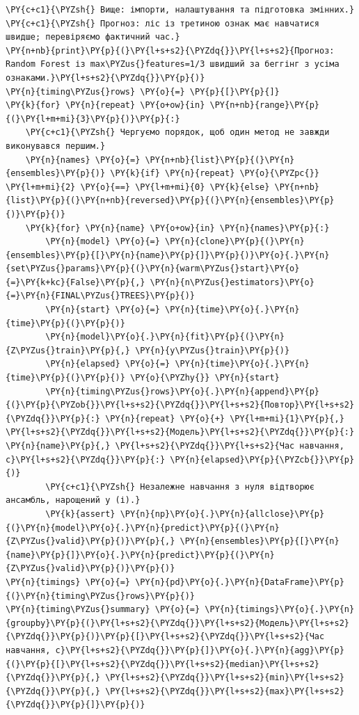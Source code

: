 \begin{Verbatim}[commandchars=\\\{\}]
\PY{c+c1}{\PYZsh{} Вище: імпорти, налаштування та підготовка змінних.}
\PY{c+c1}{\PYZsh{} Прогноз: ліс із третиною ознак має навчатися швидше; перевіряємо фактичний час.}
\PY{n+nb}{print}\PY{p}{(}\PY{l+s+s2}{\PYZdq{}}\PY{l+s+s2}{Прогноз: Random Forest із max\PYZus{}features=1/3 швидший за беггінг з усіма ознаками.}\PY{l+s+s2}{\PYZdq{}}\PY{p}{)}
\PY{n}{timing\PYZus{}rows} \PY{o}{=} \PY{p}{[}\PY{p}{]}
\PY{k}{for} \PY{n}{repeat} \PY{o+ow}{in} \PY{n+nb}{range}\PY{p}{(}\PY{l+m+mi}{3}\PY{p}{)}\PY{p}{:}
    \PY{c+c1}{\PYZsh{} Чергуємо порядок, щоб один метод не завжди виконувався першим.}
    \PY{n}{names} \PY{o}{=} \PY{n+nb}{list}\PY{p}{(}\PY{n}{ensembles}\PY{p}{)} \PY{k}{if} \PY{n}{repeat} \PY{o}{\PYZpc{}} \PY{l+m+mi}{2} \PY{o}{==} \PY{l+m+mi}{0} \PY{k}{else} \PY{n+nb}{list}\PY{p}{(}\PY{n+nb}{reversed}\PY{p}{(}\PY{n}{ensembles}\PY{p}{)}\PY{p}{)}
    \PY{k}{for} \PY{n}{name} \PY{o+ow}{in} \PY{n}{names}\PY{p}{:}
        \PY{n}{model} \PY{o}{=} \PY{n}{clone}\PY{p}{(}\PY{n}{ensembles}\PY{p}{[}\PY{n}{name}\PY{p}{]}\PY{p}{)}\PY{o}{.}\PY{n}{set\PYZus{}params}\PY{p}{(}\PY{n}{warm\PYZus{}start}\PY{o}{=}\PY{k+kc}{False}\PY{p}{,} \PY{n}{n\PYZus{}estimators}\PY{o}{=}\PY{n}{FINAL\PYZus{}TREES}\PY{p}{)}
        \PY{n}{start} \PY{o}{=} \PY{n}{time}\PY{o}{.}\PY{n}{time}\PY{p}{(}\PY{p}{)}
        \PY{n}{model}\PY{o}{.}\PY{n}{fit}\PY{p}{(}\PY{n}{Z\PYZus{}train}\PY{p}{,} \PY{n}{y\PYZus{}train}\PY{p}{)}
        \PY{n}{elapsed} \PY{o}{=} \PY{n}{time}\PY{o}{.}\PY{n}{time}\PY{p}{(}\PY{p}{)} \PY{o}{\PYZhy{}} \PY{n}{start}
        \PY{n}{timing\PYZus{}rows}\PY{o}{.}\PY{n}{append}\PY{p}{(}\PY{p}{\PYZob{}}\PY{l+s+s2}{\PYZdq{}}\PY{l+s+s2}{Повтор}\PY{l+s+s2}{\PYZdq{}}\PY{p}{:} \PY{n}{repeat} \PY{o}{+} \PY{l+m+mi}{1}\PY{p}{,} \PY{l+s+s2}{\PYZdq{}}\PY{l+s+s2}{Модель}\PY{l+s+s2}{\PYZdq{}}\PY{p}{:} \PY{n}{name}\PY{p}{,} \PY{l+s+s2}{\PYZdq{}}\PY{l+s+s2}{Час навчання, с}\PY{l+s+s2}{\PYZdq{}}\PY{p}{:} \PY{n}{elapsed}\PY{p}{\PYZcb{}}\PY{p}{)}
        \PY{c+c1}{\PYZsh{} Незалежне навчання з нуля відтворює ансамбль, нарощений у (і).}
        \PY{k}{assert} \PY{n}{np}\PY{o}{.}\PY{n}{allclose}\PY{p}{(}\PY{n}{model}\PY{o}{.}\PY{n}{predict}\PY{p}{(}\PY{n}{Z\PYZus{}valid}\PY{p}{)}\PY{p}{,} \PY{n}{ensembles}\PY{p}{[}\PY{n}{name}\PY{p}{]}\PY{o}{.}\PY{n}{predict}\PY{p}{(}\PY{n}{Z\PYZus{}valid}\PY{p}{)}\PY{p}{)}
\PY{n}{timings} \PY{o}{=} \PY{n}{pd}\PY{o}{.}\PY{n}{DataFrame}\PY{p}{(}\PY{n}{timing\PYZus{}rows}\PY{p}{)}
\PY{n}{timing\PYZus{}summary} \PY{o}{=} \PY{n}{timings}\PY{o}{.}\PY{n}{groupby}\PY{p}{(}\PY{l+s+s2}{\PYZdq{}}\PY{l+s+s2}{Модель}\PY{l+s+s2}{\PYZdq{}}\PY{p}{)}\PY{p}{[}\PY{l+s+s2}{\PYZdq{}}\PY{l+s+s2}{Час навчання, с}\PY{l+s+s2}{\PYZdq{}}\PY{p}{]}\PY{o}{.}\PY{n}{agg}\PY{p}{(}\PY{p}{[}\PY{l+s+s2}{\PYZdq{}}\PY{l+s+s2}{median}\PY{l+s+s2}{\PYZdq{}}\PY{p}{,} \PY{l+s+s2}{\PYZdq{}}\PY{l+s+s2}{min}\PY{l+s+s2}{\PYZdq{}}\PY{p}{,} \PY{l+s+s2}{\PYZdq{}}\PY{l+s+s2}{max}\PY{l+s+s2}{\PYZdq{}}\PY{p}{]}\PY{p}{)}

\end{Verbatim}
